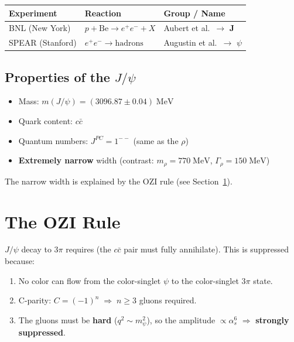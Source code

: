 \vspace{6pt}
\begin{center}
\begin{tabular}{L{3.2cm} L{5cm} L{4cm}}
  \toprule
  \color{white}\textbf{Experiment} &
  \color{white}\textbf{Reaction} &
  \color{white}\textbf{Group / Name} \\
  \midrule
  BNL (New York)      & $p + \mathrm{Be} \to e^+e^- + X$   & Aubert et al.\ $\to$ \textbf{J} \\
  SPEAR (Stanford)    & $e^+e^- \to \mathrm{hadrons}$       & Augustin et al.\ $\to$ \textbf{$\psi$} \\
  \bottomrule
\end{tabular}
\end{center}
\vspace{6pt}

\subsection{Properties of the \texorpdfstring{$J/\psi$}{J/psi}}

\begin{itemize}
  \item Mass: $m(J/\psi) = (3096.87 \pm 0.04)\;\mathrm{MeV}$
  \item Quark content: $c\bar{c}$
  \item Quantum numbers: $J^{PC} = 1^{--}$ (same as the $\rho$)
  \item \textbf{Extremely narrow} width
        (contrast: $m_\rho = 770\;\mathrm{MeV}$, $\Gamma_\rho = 150\;\mathrm{MeV}$)
\end{itemize}

\begin{notebox}
  The narrow width is explained by the OZI rule (see Section~\ref{sec:ozi}).
\end{notebox}

\section{The OZI Rule}
\label{sec:ozi}

$J/\psi$ decay to $3\pi$ requires 
(the $c\bar{c}$ pair must fully annihilate). This is suppressed because:

\begin{enumerate}
  \item No color can flow from the color-singlet $\psi$ to the color-singlet $3\pi$ state.
  \item C-parity: $C = (-1)^n \;\Rightarrow\; n \geq 3$ gluons required.
  \item The gluons must be \textbf{hard} ($q^2 \sim m_\psi^2$), so the amplitude
        $\propto \alpha_s^6$ $\Rightarrow$ \textbf{strongly suppressed}.
\end{enumerate}

